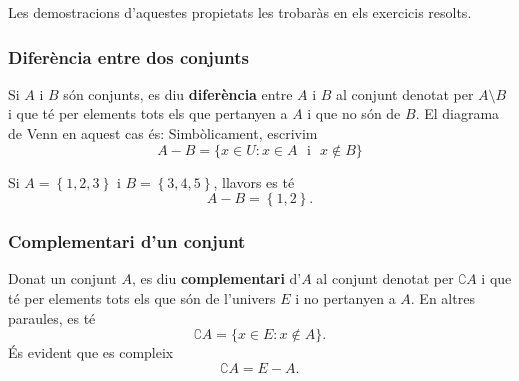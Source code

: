 Les demostracions d'aquestes propietats les trobar\`{a}s en els exercicis
resolts.

\subsubsection{Difer\`{e}ncia entre dos conjunts}

Si $A$ i $B$ s\'{o}n conjunts, es diu \textbf{difer\`{e}ncia} entre $A$ i $B$
al conjunt denotat per $A\setminus B$ i que t\'{e} per elements tots els que
pertanyen a $A$ i que no s\'{o}n de $B$. El diagrama de Venn en aquest cas
\'{e}s: Simb\`{o}licament,
escrivim%
\begin{equation*}
A-B=\{x\in U:x\in A\text{ ~i~ }x\notin B\}
\end{equation*}

\begin{exemple}
Si $A=\left\{ 1,2,3\right\} $ i $B=\left\{ 3,4,5\right\} $, llavors es t\'{e}%
\begin{equation*}
A-B=\left\{ 1,2\right\} \text{.}
\end{equation*}
\end{exemple}

\subsubsection{Complementari d'un conjunt}

Donat un conjunt $A$, es diu \textbf{complementari} d'$A$ al conjunt denotat
per $\complement A$ i que t\'{e} per elements tots els que s\'{o}n de
l'univers $E$ i no pertanyen a $A$.
En altres paraules, es t\'{e}%
\begin{equation*}
\complement A=\{x\in E:x\notin A\}\text{.}
\end{equation*}
\'{E}s evident que es compleix%
\begin{equation*}
\complement A=E-A\text{.}
\end{equation*}

